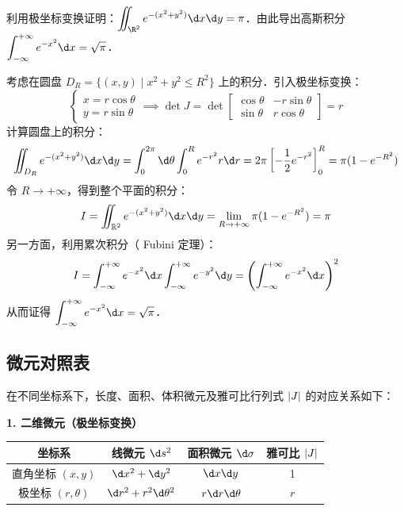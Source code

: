 \documentclass[12pt, a4paper, oneside, UTF8]{ctexbook}
\begin{document}
\begin{example}
    利用极坐标变换证明：$\displaystyle\iint_{\R^2} e^{-(x^2+y^2)} \d x \d y = \pi$．由此导出高斯积分 $\displaystyle\int_{-\infty}^{+\infty} e^{-x^2} \d x = \sqrt{\pi}$．
\end{example}
\begin{solution}
    考虑在圆盘 $D_R = \{(x,y) \mid x^2+y^2 \le R^2\}$ 上的积分．引入极坐标变换：
    \[ \begin{cases} x = r\cos\theta \\ y = r\sin\theta \end{cases} \implies \det J = \det \begin{bmatrix} \cos\theta & -r\sin\theta \\ \sin\theta & r\cos\theta \end{bmatrix} = r \]
    计算圆盘上的积分：
    \[ \iint_{D_R} e^{-(x^2+y^2)} \d x \d y = \int_0^{2\pi} \d\theta \int_0^R e^{-r^2} r \d r = 2\pi \left[ -\frac{1}{2}e^{-r^2} \right]_0^R = \pi(1-e^{-R^2}) \]
    令 $R \to +\infty$，得到整个平面的积分：
    \[ I = \iint_{\mathbb{R}^2} e^{-(x^2+y^2)} \d x \d y = \lim_{R \to +\infty} \pi(1-e^{-R^2}) = \pi \]
    另一方面，利用累次积分（ Fubini 定理）：
    \[ I = \int_{-\infty}^{+\infty} e^{-x^2} \d x \int_{-\infty}^{+\infty} e^{-y^2} \d y = \left( \int_{-\infty}^{+\infty} e^{-x^2} \d x \right)^2 \]
    从而证得 $\displaystyle\int_{-\infty}^{+\infty} e^{-x^2} \d x = \sqrt{\pi}$．
\end{solution}

\subsection{微元对照表}
在不同坐标系下，长度、面积、体积微元及雅可比行列式 $\abs{J}$ 的对应关系如下：

\noindent \textbf{1. 二维微元（极坐标变换）}
\begin{center}
\renewcommand{\arraystretch}{1.5}
\begin{tabular}{|c|c|c|c|}
\hline
\textbf{坐标系} & \textbf{线微元 $\d s^2$} & \textbf{面积微元 $\d \sigma$} & \textbf{雅可比 $\abs{J}$} \\ \hline
直角坐标 $(x,y)$ & $\d x^2 + \d y^2$ & $\d x \d y$ & 1 \\ \hline
极坐标 $(r,\theta)$ & $\d r^2 + r^2 \d \theta^2$ & $r \d r \d \theta$ & $r$ \\ \hline
\end{tabular}
\end{center}
\end{document}
